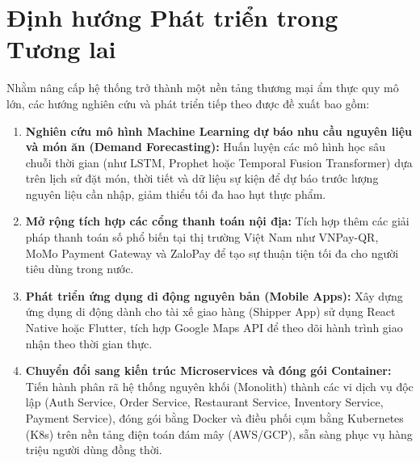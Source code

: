 \documentclass{uetgraduation}
\begin{document}
\section{Định hướng Phát triển trong Tương lai}
Nhằm nâng cấp hệ thống trở thành một nền tảng thương mại ẩm thực quy mô lớn, các hướng nghiên cứu và phát triển tiếp theo được đề xuất bao gồm:
\begin{enumerate}
    \item \textbf{Nghiên cứu mô hình Machine Learning dự báo nhu cầu nguyên liệu và món ăn (Demand Forecasting):} Huấn luyện các mô hình học sâu chuỗi thời gian (như LSTM, Prophet hoặc Temporal Fusion Transformer) dựa trên lịch sử đặt món, thời tiết và dữ liệu sự kiện để dự báo trước lượng nguyên liệu cần nhập, giảm thiểu tối đa hao hụt thực phẩm.
    \item \textbf{Mở rộng tích hợp các cổng thanh toán nội địa:} Tích hợp thêm các giải pháp thanh toán số phổ biến tại thị trường Việt Nam như VNPay-QR, MoMo Payment Gateway và ZaloPay để tạo sự thuận tiện tối đa cho người tiêu dùng trong nước.
    \item \textbf{Phát triển ứng dụng di động nguyên bản (Mobile Apps):} Xây dựng ứng dụng di động dành cho tài xế giao hàng (Shipper App) sử dụng React Native hoặc Flutter, tích hợp Google Maps API để theo dõi hành trình giao nhận theo thời gian thực.
    \item \textbf{Chuyển đổi sang kiến trúc Microservices và đóng gói Container:} Tiến hành phân rã hệ thống nguyên khối (Monolith) thành các vi dịch vụ độc lập (Auth Service, Order Service, Restaurant Service, Inventory Service, Payment Service), đóng gói bằng Docker và điều phối cụm bằng Kubernetes (K8s) trên nền tảng điện toán đám mây (AWS/GCP), sẵn sàng phục vụ hàng triệu người dùng đồng thời.
\end{enumerate}
\end{document}
